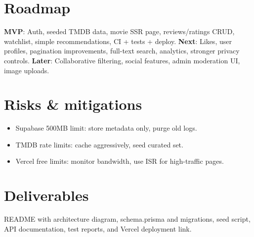 \documentclass[11pt,a4paper]{article}
\begin{document}
\section{Roadmap}
\textbf{MVP}: Auth, seeded TMDB data, movie SSR page, reviews/ratings CRUD, watchlist, simple recommendations, CI + tests + deploy.  
\textbf{Next}: Likes, user profiles, pagination improvements, full-text search, analytics, stronger privacy controls.  
\textbf{Later}: Collaborative filtering, social features, admin moderation UI, image uploads.

\section{Risks \& mitigations}
\begin{itemize}
  \item Supabase 500MB limit: store metadata only, purge old logs.
  \item TMDB rate limits: cache aggressively, seed curated set.
  \item Vercel free limits: monitor bandwidth, use ISR for high-traffic pages.
\end{itemize}

\section{Deliverables}
README with architecture diagram, schema.prisma and migrations, seed script, API documentation, test reports, and Vercel deployment link.
\end{document}
